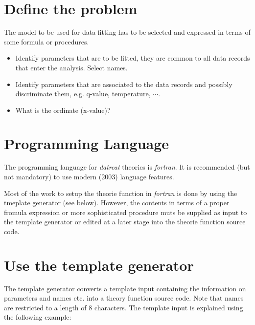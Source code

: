 \documentclass{article}
\begin{document}
\section{Define the problem}
\label{sec:problem}

The model to be used for data-fitting has to be selected and expressed in terms
of some formula or procedures.

\begin{itemize}
\item Identify parameters that are to be fitted, they are common to all data records that enter
      the analysis. Select names.
\item Identify parameters that are associated to the data records and possibly discriminate them,
      e.g. q-value, temperature, $\cdots$.
\item What is the ordinate (x-value)?
\end{itemize}


\section{Programming Language}
\label{sec:proglang}

The programming language for \emph{datreat} theories is \emph{fortran}.
It is recommended (but not mandatory) to use modern (2003) language features.

Most of the work to setup the theorie function in \emph{fortran} is done by using the
tmeplate generator (see below). 
However, the contents in terms of a proper fromula expression or more sophisticated 
procedure muts be supplied as input to the template generator or edited at a later stage
into the theorie function source code. 

\section{Use the template generator}
\label{sec:template}

The template generator converts a template input containing the information on 
parameters and names etc. into a theory function source code.
Note that names are restricted to a length of 8 characters.
The template input is explained using the following example:
\end{document}
